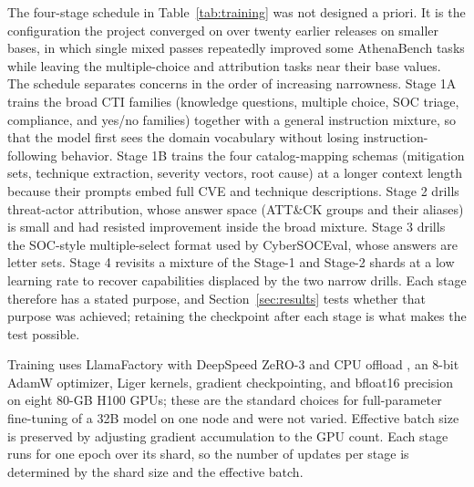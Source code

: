 \documentclass[preprint,12pt,authoryear]{elsarticle}
\begin{document}
The four-stage schedule in Table~\ref{tab:training} was not designed a priori. It is the configuration the project converged on over twenty earlier releases on smaller bases, in which single mixed passes repeatedly improved some AthenaBench tasks while leaving the multiple-choice and attribution tasks near their base values. The schedule separates concerns in the order of increasing narrowness. Stage 1A trains the broad CTI families (knowledge questions, multiple choice, SOC triage, compliance, and yes/no families) together with a general instruction mixture, so that the model first sees the domain vocabulary without losing instruction-following behavior. Stage 1B trains the four catalog-mapping schemas (mitigation sets, technique extraction, severity vectors, root cause) at a longer context length because their prompts embed full CVE and technique descriptions. Stage 2 drills threat-actor attribution, whose answer space (ATT\&CK groups and their aliases) is small and had resisted improvement inside the broad mixture. Stage 3 drills the SOC-style multiple-select format used by CyberSOCEval, whose answers are letter sets. Stage 4 revisits a mixture of the Stage-1 and Stage-2 shards at a low learning rate to recover capabilities displaced by the two narrow drills. Each stage therefore has a stated purpose, and Section~\ref{sec:results} tests whether that purpose was achieved; retaining the checkpoint after each stage is what makes the test possible.

Training uses LlamaFactory \citep{zheng2024llamafactory} with DeepSpeed ZeRO-3 and CPU offload \citep{rajbhandari2020zero}, an 8-bit AdamW optimizer, Liger kernels, gradient checkpointing, and bfloat16 precision on eight 80-GB H100 GPUs; these are the standard choices for full-parameter fine-tuning of a 32B model on one node and were not varied. Effective batch size is preserved by adjusting gradient accumulation to the GPU count. Each stage runs for one epoch over its shard, so the number of updates per stage is determined by the shard size and the effective batch.
\end{document}
